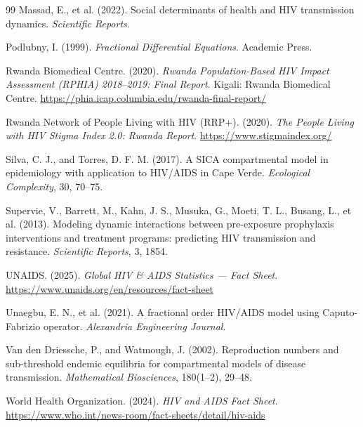 \documentclass[12pt,a4paper,oneside]{report}
\begin{document}
\begin{thebibliography}{99}
Massad, E., et al. (2022).
Social determinants of health and HIV transmission dynamics.
\textit{Scientific Reports}.

Podlubny, I. (1999).
\textit{Fractional Differential Equations}.
Academic Press.

Rwanda Biomedical Centre. (2020).
\textit{Rwanda Population-Based HIV Impact Assessment (RPHIA) 2018--2019: Final Report}.
Kigali: Rwanda Biomedical Centre.
\url{https://phia.icap.columbia.edu/rwanda-final-report/}

Rwanda Network of People Living with HIV (RRP+). (2020).
\textit{The People Living with HIV Stigma Index 2.0: Rwanda Report}.
\url{https://www.stigmaindex.org/}

Silva, C. J., and Torres, D. F. M. (2017).
A SICA compartmental model in epidemiology with application to HIV/AIDS in Cape Verde.
\textit{Ecological Complexity}, 30, 70--75.

Supervie, V., Barrett, M., Kahn, J. S., Musuka, G., Moeti, T. L., Busang, L., et al. (2013).
Modeling dynamic interactions between pre-exposure prophylaxis interventions and treatment programs: predicting HIV transmission and resistance.
\textit{Scientific Reports}, 3, 1854.

UNAIDS. (2025).
\textit{Global HIV \& AIDS Statistics — Fact Sheet}.
\url{https://www.unaids.org/en/resources/fact-sheet}

Unaegbu, E. N., et al. (2021).
A fractional order HIV/AIDS model using Caputo-Fabrizio operator.
\textit{Alexandria Engineering Journal}.

Van den Driessche, P., and Watmough, J. (2002).
Reproduction numbers and sub-threshold endemic equilibria for compartmental models of disease transmission.
\textit{Mathematical Biosciences}, 180(1--2), 29--48.

World Health Organization. (2024).
\textit{HIV and AIDS Fact Sheet}.
\url{https://www.who.int/news-room/fact-sheets/detail/hiv-aids}

\end{thebibliography}
\end{document}
